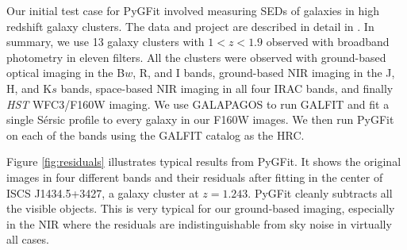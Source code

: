 \documentclass[apj]{emulateapj}
\newcommand{\sersic}{S\'{e}rsic}
\newcommand{\galfit}{GALFIT}
\newcommand{\pygfit}{PyGFit}
\newcommand{\galapagos}{GALAPAGOS}
\begin{document}
\begin{figure*}
\caption{Three examples of cases where \pygfit{} can fail.  The top row of panels shows the F160W images used to create the HRC.  The center row of panels shows the LRI with the same field of view, while the bottom row of panels shows the residuals of the LRI after fitting.  The LRI for the left uses ground-based R band imaging, while the example in the center is taken from the $4.5\mu$m imaging and the example on the right is taken from the IRAC $3.6\mu$m imaging.  The left column shows a galaxy with extended features which cannot be described by a \sersic{} profile.  The center column shows a galaxy which is isolated in F160W but which is blended with another source in $4.5\mu$m.  The right column shows a galaxy near the edge of the F160W image which is blended with a bright source which is outside of the F160W image.  Further details are in the text.}\label{fig:problems}
\end{figure*}

Our initial test case for \pygfit{} involved measuring SEDs of galaxies in high redshift galaxy clusters.  The data and project are described in detail in \citet{mancone13}.  In summary, we use 13 galaxy clusters with $1 < z < 1.9$ observed with broadband photometry in eleven filters.  All the clusters were observed with ground-based optical imaging in the B$w$, R, and I bands, ground-based NIR imaging in the J, H, and K$s$ bands, space-based NIR imaging in all four IRAC bands, and finally {\itshape HST} WFC3/F160W imaging.  We use \galapagos{} \citep{galapagos} to run \galfit{} and fit a single \sersic{} profile to every galaxy in our F160W images.  We then run \pygfit{} on each of the bands using the \galfit{} catalog as the HRC.

Figure \ref{fig:residuals} illustrates typical results from \pygfit{}.  It shows the original images in four different bands and their residuals after fitting in the center of ISCS J1434.5+3427, a galaxy cluster at $z=1.243$.  \pygfit{} cleanly subtracts all the visible objects.  This is very typical for our ground-based imaging, especially in the NIR where the residuals are indistinguishable from sky noise in virtually all cases.
\end{document}
